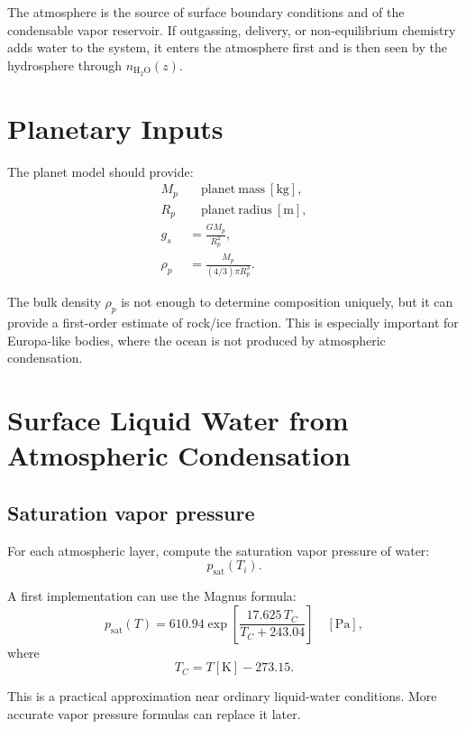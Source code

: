 \documentclass[11pt]{article}
\begin{document}
The atmosphere is the source of surface boundary conditions and of the
condensable vapor reservoir. If outgassing, delivery, or non-equilibrium
chemistry adds water to the system, it enters the atmosphere first and is then
seen by the hydrosphere through $n_{\mathrm{H_2O}}(z)$.

\section{Planetary Inputs}

The planet model should provide:
\begin{align}
    M_p      &\quad \mathrm{planet\ mass}\ [\mathrm{kg}], \\
    R_p      &\quad \mathrm{planet\ radius}\ [\mathrm{m}], \\
    g_s      &= \frac{G M_p}{R_p^2}, \\
    \rho_p   &= \frac{M_p}{(4/3)\pi R_p^3}.
\end{align}

The bulk density $\rho_p$ is not enough to determine composition uniquely, but
it can provide a first-order estimate of rock/ice fraction. This is especially
important for Europa-like bodies, where the ocean is not produced by
atmospheric condensation.

\section{Surface Liquid Water from Atmospheric Condensation}

\subsection{Saturation vapor pressure}

For each atmospheric layer, compute the saturation vapor pressure of water:
\begin{equation}
    p_{\mathrm{sat}}(T_i).
\end{equation}

A first implementation can use the Magnus formula:
\begin{equation}
    p_{\mathrm{sat}}(T) =
    610.94
    \exp\left[
        \frac{17.625\,T_C}{T_C + 243.04}
    \right]
    \quad [\mathrm{Pa}],
\end{equation}
where
\begin{equation}
    T_C = T[\mathrm{K}] - 273.15.
\end{equation}

This is a practical approximation near ordinary liquid-water conditions. More
accurate vapor pressure formulas can replace it later.
\end{document}
